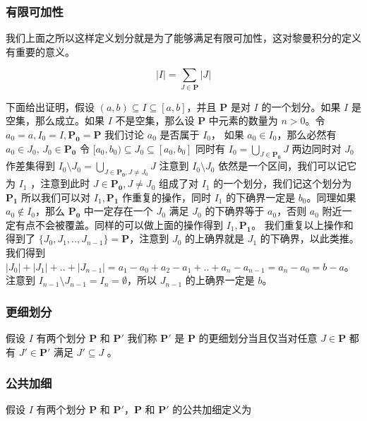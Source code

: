 \subsubsection{有限可加性}

我们上面之所以这样定义划分就是为了能够满足有限可加性，这对黎曼积分的定义有重要的意义。

\[
    \lvert I \rvert = \sum_{J \in \mathbf{P}} \lvert J \rvert
\]

下面给出证明，假设 $(a,b) \subseteq I \subseteq [a,b] $，并且 $\mathbf{P}$ 是对 $I$ 的一个划分。如果 $I$ 是空集，那么成立。如果 $I$ 不是空集，那么设 $\mathbf{P}$ 中元素的数量为 $n > 0$。令 $a_0=a, I_0 = I, \mathbf{P_0} = \mathbf{P}$ 我们讨论 $a_0$ 是否属于 $I_0$，
如果 $a_0 \in I_0$，那么必然有 $a_0 \in J_0 ,\, J_0 \in \mathbf{P_0}$ 令 $[a_0, b_0) \subseteq J_0 \subseteq [a_0, b_0]$ 同时有 $I_0 = \bigcup_{J \in \mathbf{P_0}} J $ 两边同时对 $J_0$ 作差集得到 $I_0 \setminus J_0 = \bigcup_{J \in \mathbf{P_0}, J \ne J_0}J$ 
注意到 $I_0 \setminus J_0$ 依然是一个区间，我们可以记它为 $I_1$ ，注意到此时 $J \in \mathbf{P_0}, J \ne J_0$ 组成了对 $I_1$ 的一个划分，我们记这个划分为 $\mathbf{P_1}$ 所以我们可以对 $I_1, \mathbf{P_1}$ 作重复的操作，同时 $I_1$ 的下确界一定是 $b_0$。同理如果 $a_0 \notin I_0$，那么 $\mathbf{P_0}$ 中一定存在一个 $J_0$ 满足 $J_0$ 的下确界等于 $a_0$，否则 $a_0$ 附近一定有点不会被覆盖。同样的可以做上面的操作得到 $I_1, \mathbf{P_1}$。
我们重复以上操作和得到了 $\{ J_0, J_1, .., J_{n-1} \} = \mathbf{P}$，注意到 $J_0$ 的上确界就是 $J_1$ 的下确界，以此类推。我们得到 $\lvert J_0 \rvert + \lvert J_1 \rvert  + .. + \lvert J_{n-1} \rvert = a_1 -a_0 + a_2 - a_1 + .. + a_n - a_{n-1} = a_n - a_0 = b - a$。
注意到 $I_{n-1} \setminus J_{n-1} = I_n = \emptyset$，所以 $J_{n-1}$ 的上确界一定是 $b$。

\subsubsection{更细划分}

假设 $I $ 有两个划分 $\mathbf{P}$ 和 $\mathbf{P'}$ 我们称 $\mathbf{P'}$ 是 $\mathbf{P}$ 的更细划分当且仅当对任意 $J \in \mathbf{P}$ 都有 $J' \in \mathbf{P'}$ 满足 $J' \subseteq J$ 。

\subsubsection{公共加细}

假设 $I $ 有两个划分 $\mathbf{P}$ 和 $\mathbf{P'}$，$\mathbf{P}$ 和 $\mathbf{P'}$ 的公共加细定义为 

